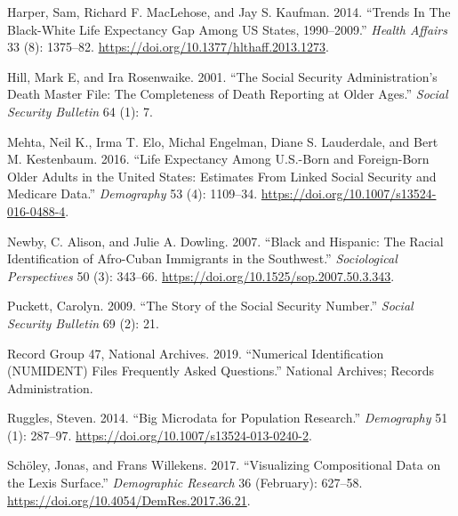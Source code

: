 \documentclass[
  11pt,
]{article}
\newlength{\cslhangindent}
\newlength{\cslentryspacingunit} %
\newenvironment{CSLReferences}[2] %
 {%
  \setlength{\parindent}{0pt}
  \ifodd #1
  \let\oldpar\par
  \def\par{\hangindent=\cslhangindent\oldpar}
  \fi
  \setlength{\parskip}{#2\cslentryspacingunit}
 }%
 {}
\begin{document}
\begin{CSLReferences}{1}{0}
\leavevmode{}%
Harper, Sam, Richard F. MacLehose, and Jay S. Kaufman. 2014. {``Trends
{In} {The} {Black}-{White} {Life} {Expectancy} {Gap} {Among} {US}
{States}, 1990--2009.''} \emph{Health Affairs} 33 (8): 1375--82.
\url{https://doi.org/10.1377/hlthaff.2013.1273}.

\leavevmode{}%
Hill, Mark E, and Ira Rosenwaike. 2001. {``The {Social} {Security}
{Administration}'s {Death} {Master} {File}: {The} {Completeness} of
{Death} {Reporting} at {Older} {Ages}.''} \emph{Social Security
Bulletin} 64 (1): 7.

\leavevmode{}%
Mehta, Neil K., Irma T. Elo, Michal Engelman, Diane S. Lauderdale, and
Bert M. Kestenbaum. 2016. {``Life {Expectancy} {Among} {U}.{S}.-Born and
{Foreign}-Born {Older} {Adults} in the {United} {States}: {Estimates}
{From} {Linked} {Social} {Security} and {Medicare} {Data}.''}
\emph{Demography} 53 (4): 1109--34.
\url{https://doi.org/10.1007/s13524-016-0488-4}.

\leavevmode{}%
Newby, C. Alison, and Julie A. Dowling. 2007. {``Black and {Hispanic}:
{The} {Racial} {Identification} of {Afro}-{Cuban} {Immigrants} in the
{Southwest}.''} \emph{Sociological Perspectives} 50 (3): 343--66.
\url{https://doi.org/10.1525/sop.2007.50.3.343}.

\leavevmode{}%
Puckett, Carolyn. 2009. {``The {Story} of the {Social} {Security}
{Number}.''} \emph{Social Security Bulletin} 69 (2): 21.

\leavevmode{}%
Record Group 47, National Archives. 2019. {``Numerical {Identification}
({NUMIDENT}) {Files} {Frequently} {Asked} {Questions}.''} National
Archives; Records Administration.

\leavevmode{}%
Ruggles, Steven. 2014. {``Big {Microdata} for {Population}
{Research}.''} \emph{Demography} 51 (1): 287--97.
\url{https://doi.org/10.1007/s13524-013-0240-2}.

\leavevmode{}%
Schöley, Jonas, and Frans Willekens. 2017. {``Visualizing Compositional
Data on the {Lexis} Surface.''} \emph{Demographic Research} 36
(February): 627--58. \url{https://doi.org/10.4054/DemRes.2017.36.21}.


\end{CSLReferences}
\end{document}
